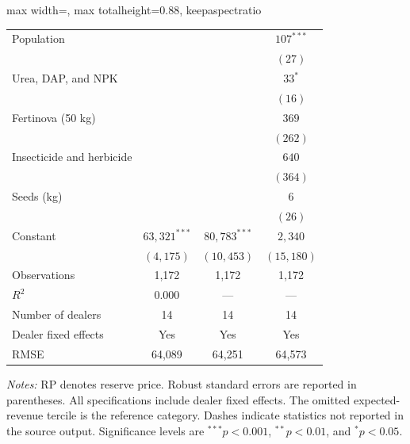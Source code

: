 \documentclass[11pt]{article}
\begin{document}
\begin{table}[!htbp]
\begin{adjustbox}{max width=\textwidth,
                  max totalheight=0.88\textheight,
                  keepaspectratio}
\begin{threeparttable}
\begin{tabular}{lccc}
Population
    & & & $107^{***}$ \\
    & & & $(27)$ \\

Urea, DAP, and NPK
    & & & $33^{*}$ \\
    & & & $(16)$ \\

Fertinova (50 kg)
    & & & $369$ \\
    & & & $(262)$ \\

Insecticide and herbicide
    & & & $640$ \\
    & & & $(364)$ \\

Seeds (kg)
    & & & $6$ \\
    & & & $(26)$ \\

\addlinespace
Constant
    & $63{,}321^{***}$
    & $80{,}783^{***}$
    & $2{,}340$ \\
    & $(4{,}175)$
    & $(10{,}453)$
    & $(15{,}180)$ \\

\midrule
Observations
    & 1,172 & 1,172 & 1,172 \\
$R^{2}$
    & 0.000 & --- & --- \\
Number of dealers
    & 14 & 14 & 14 \\
Dealer fixed effects
    & Yes & Yes & Yes \\
RMSE
    & 64,089 & 64,251 & 64,573 \\
\bottomrule
\end{tabular}

\begin{tablenotes}[flushleft]
\footnotesize
\item \textit{Notes:} RP denotes reserve price. Robust standard errors are
reported in parentheses. All specifications include dealer fixed effects.
The omitted expected-revenue tercile is the reference category. Dashes
indicate statistics not reported in the source output. Significance levels
are $^{***}p<0.001$, $^{**}p<0.01$, and $^{*}p<0.05$.
\end{tablenotes}

\end{threeparttable}
\end{adjustbox}
\end{table}
\end{document}
